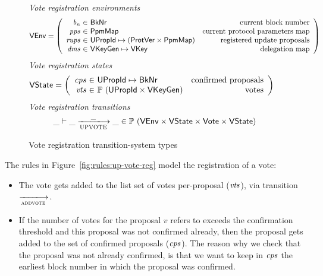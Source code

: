 \begin{figure}[htb]
  \emph{Vote registration environments}
  \begin{align*}
    & \VEnv
      = \left(
      \begin{array}{r@{~\in~}lr}
        \var{b_n} & \BkNr & \text{current block number}\\
        \var{pps} & \PPMMap & \text{current protocol parameters map}\\
        \var{rups} & \UPropId \mapsto (\ProtVer \times \PPMMap)
        & \text{registered update proposals}\\
        \var{dms} & \VKeyGen \mapsto \VKey & \text{delegation map}
      \end{array}\right)
  \end{align*}
  \emph{Vote registration states}
  \begin{align*}
    & \VState
      = \left(
      \begin{array}{r@{~\in~}lr}
        \var{cps} & \UPropId \mapsto \BkNr & \text{confirmed proposals}\\
        \var{vts} & \powerset{(\UPropId \times \VKeyGen)} & \text{votes}
      \end{array}\right)
  \end{align*}
  \emph{Vote registration transitions}
    \begin{equation*}
    \_ \vdash \_ \trans{UPVOTE}{\_} \_ \in
    \powerset (\VEnv \times \VState \times \Vote \times \VState)
    \end{equation*}
  \caption{Vote registration transition-system types}
  \label{fig:ts-types:vote-reg}
\end{figure}

The rules in Figure~\ref{fig:rules:up-vote-reg} model the registration of a vote:
\begin{itemize}
\item The vote gets added to the list set of votes per-proposal ($\mathit{vts}$),
  via transition $\trans{addvote}{}$.
\item If the number of votes for the proposal $v$ refers to exceeds the
  confirmation threshold and this proposal was not confirmed already, then the
  proposal gets added to the set of confirmed proposals ($\mathit{cps}$). The
  reason why we check that the proposal was not already confirmed, is that we
  want to keep in $\mathit{cps}$ the earliest block number in which the proposal
  was confirmed.
\end{itemize}

